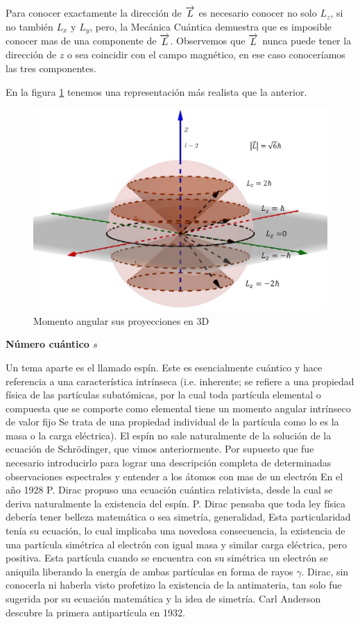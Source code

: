 Para conocer exactamente la dirección de $\overrightarrow{L}$ es necesario conocer no solo $L_{z}$, si no también $L_{x}$ y $L_{y}$, pero, la Mecánica Cuántica demuestra que es imposible conocer mas de una componente de $\overrightarrow{L}$. Observemos que $\overrightarrow{L}$ nunca puede tener la dirección de $z$ o sea coincidir con el campo
magnético, en ese caso conoceríamos las tres componentes.

En la figura \ref{fig:129} tenemos una representación más realista que la anterior.

\begin{figure}[H]
    \centering
    \includegraphics[width=1.0\textwidth]{./Figures/fig129}
	\caption{Momento angular sus proyecciones en 3D}
	\label{fig:129}
\end{figure}

\textbf{Número cuántico $s$}

Un tema aparte es el llamado espín. Este es esencialmente cuántico y hace referencia a una característica intrínseca (i.e. inherente; se refiere a una propiedad física de las partículas subatómicas, por la cual toda partícula elemental o compuesta que se comporte como elemental tiene un momento angular intrínseco de valor fijo Se trata de una propiedad individual de la partícula como lo es la masa o la carga eléctrica). El espín no sale naturalmente de la solución de la ecuación de Schrödinger, que vimos anteriormente. Por supuesto que fue necesario introducirlo para lograr una descripción completa de determinadas observaciones espectrales y entender a los átomos con mas de un electrón En el año 1928 P. Dirac propuso una ecuación cuántica relativista, desde la cual se deriva naturalmente la existencia del espín. P. Dirac pensaba que toda ley física debería tener belleza matemática o sea simetría, generalidad, Esta particularidad tenía su ecuación, lo cual implicaba una novedosa consecuencia, la existencia de una partícula simétrica al electrón con igual masa y similar carga eléctrica, pero positiva. Esta partícula cuando se encuentra con su simétrica un electrón se aniquila liberando la energía de ambas partículas en forma de rayos $\gamma$. Dirac, sin conocerla ni haberla visto profetizo la existencia de la antimateria, tan solo fue sugerida por su ecuación matemática y la idea de simetría. Carl Anderson descubre la primera antipartícula en 1932.

